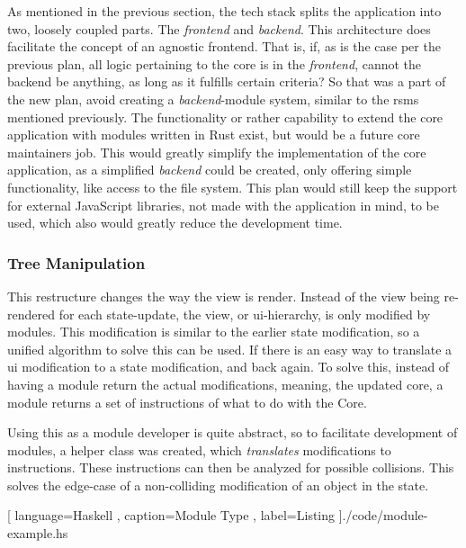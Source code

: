 As mentioned in the previous section, the tech stack splits the application into
two, loosely coupled parts. The \textit{frontend} and \textit{backend}. This
architecture does facilitate the concept of an agnostic frontend. That is, if,
as is the case per the previous plan, all logic pertaining to the core is in the
\textit{frontend}, cannot the backend be anything, as long as it fulfills
certain criteria?
So that was a part of the new plan, avoid creating a \textit{backend}-module
system, similar to the \gls{rsms} mentioned previously. The functionality or
rather capability to extend the core application with modules written in Rust
exist, but would be a future core maintainers job. This would greatly simplify
the implementation of the core application, as a simplified \textit{backend}
could be created, only offering simple functionality, like access to the file
system. This plan would still keep the support for external JavaScript
libraries, not made with the application in mind, to be used, which also would
greatly reduce the development time.

\subsubsection{Tree Manipulation}


This restructure changes the way the view is render. Instead of the view being
re-rendered for each state-update, the view, or \gls{ui}-hierarchy, is only
modified by modules. This modification is similar to the earlier state
modification, so a unified algorithm to solve this can be used. If there is an
easy way to translate a \gls{ui} modification to a state modification, and back
again. To solve this, instead of having a module return the actual
modifications, meaning, the updated core, a module returns a set of instructions
of what to do with the Core.

Using this as a module developer is quite abstract, so to facilitate development
of modules, a helper class was created, which \textit{translates} modifications
to instructions. These instructions can then be analyzed for possible
collisions. This solves the edge-case of a non-colliding modification of an
object in the state.

\begin{center}
  
   [ language=Haskell
   , caption={Module Type}
   , label=Listing
   ]{./code/module-example.hs}
\end{center}


